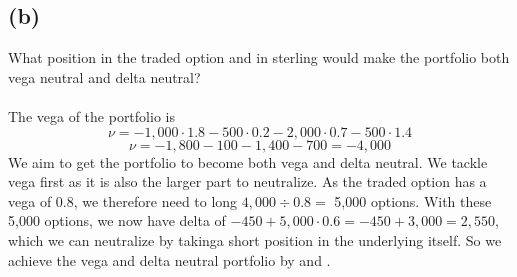 \documentclass{article}
\begin{document}
{\subsection*{(b)}
What position in the traded option and in sterling would make the portfolio both vega neutral and delta neutral? \\ \\
The vega of the portfolio is 
\[
  \nu = -1,000 \cdot 1.8 - 500 \cdot 0.2 - 2,000 \cdot 0.7 - 500 \cdot 1.4
\]
\[
  \nu = -1,800 - 100 - 1,400 - 700 = -4,000
\]
We aim to get the portfolio to become both vega and delta neutral. We tackle vega first as it is also the larger part to neutralize. As the traded option has a vega of 0.8, we therefore need to long \(4,000 \div 0.8 = \) 5,000 options. With these 5,000 options, we now have delta of \(-450 + 5,000 \cdot 0.6 = -450 + 3,000 = 2,550\), which we can neutralize by takinga  short position in the underlying itself. So we achieve the vega and delta neutral portfolio by  and .

}
\end{document}
